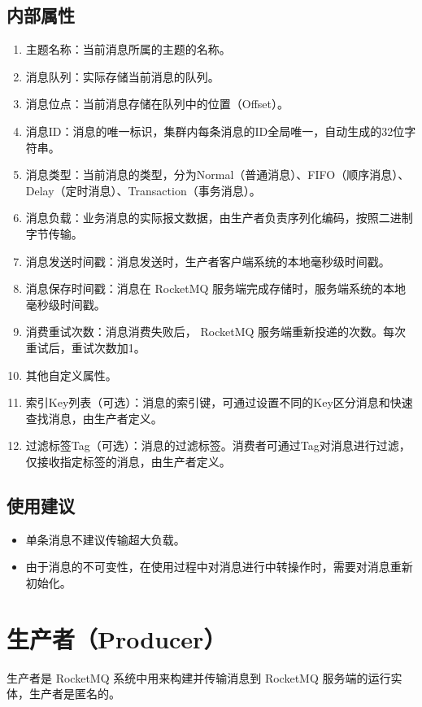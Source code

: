 \documentclass[11pt, a4paper, oneside, fontset=none]{ctexbook}
\begin{document}
\subsection{内部属性}
\begin{enumerate}
  \item 主题名称：当前消息所属的主题的名称。
  \item 消息队列：实际存储当前消息的队列。
  \item 消息位点：当前消息存储在队列中的位置（Offset）。
  \item 消息ID：消息的唯一标识，集群内每条消息的ID全局唯一，自动生成的32位字符串。
  \item 消息类型：当前消息的类型，分为Normal（普通消息）、FIFO（顺序消息）、Delay（定时消息）、Transaction（事务消息）。
  \item 消息负载：业务消息的实际报文数据，由生产者负责序列化编码，按照二进制字节传输。
  \item 消息发送时间戳：消息发送时，生产者客户端系统的本地毫秒级时间戳。
  \item 消息保存时间戳：消息在 RocketMQ 服务端完成存储时，服务端系统的本地毫秒级时间戳。
  \item 消费重试次数：消息消费失败后， RocketMQ 服务端重新投递的次数。每次重试后，重试次数加1。
  \item 其他自定义属性。
  \item 索引Key列表（可选）：消息的索引键，可通过设置不同的Key区分消息和快速查找消息，由生产者定义。
  \item 过滤标签Tag（可选）：消息的过滤标签。消费者可通过Tag对消息进行过滤，仅接收指定标签的消息，由生产者定义。
\end{enumerate}

\subsection{使用建议}
\begin{itemize}
  \item 单条消息不建议传输超大负载。
  \item 由于消息的不可变性，在使用过程中对消息进行中转操作时，需要对消息重新初始化。
\end{itemize}

\section{生产者（Producer）}
生产者是 RocketMQ 系统中用来构建并传输消息到 RocketMQ 服务端的运行实体，生产者是匿名的。
\end{document}
